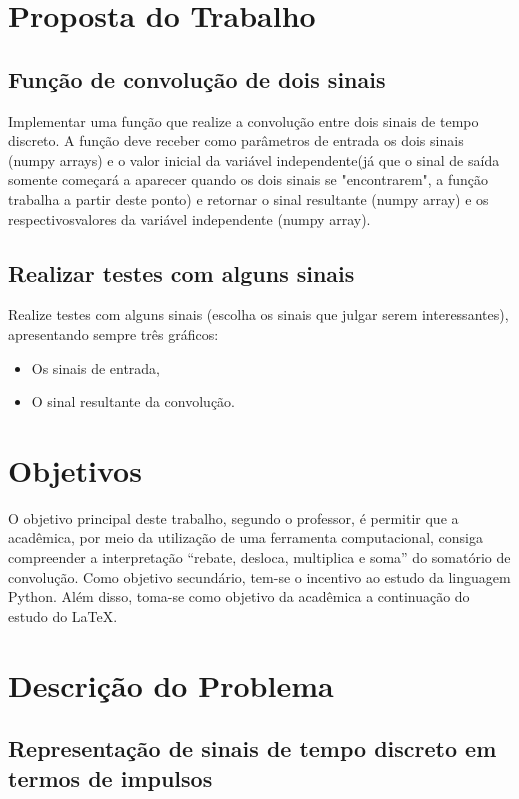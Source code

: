 \documentclass[dvipdfm, a4paper, 11pt]{report}
\begin{document}
{\section{Proposta do Trabalho}
\subsection{Função de convolução de dois sinais}
Implementar uma função que realize a convolução entre dois sinais de tempo discreto. A função
deve receber como parâmetros de entrada os dois sinais (numpy arrays) e o valor inicial da
variável independente(já que o sinal de saída somente começará a aparecer quando os dois sinais se "encontrarem", a função trabalha a partir deste ponto) e retornar o sinal resultante (numpy array) e os respectivosvalores da variável independente (numpy array).

\subsection{Realizar testes com alguns sinais}
Realize testes com alguns sinais (escolha os sinais que julgar serem interessantes), apresentando
sempre três gráficos:\\
\begin{itemize}
	\item Os sinais de entrada,
	\item O sinal resultante da convolução.
\end{itemize}
\section{Objetivos}
O objetivo principal deste trabalho, segundo o professor, é permitir que a acadêmica, 
por meio da utilização de uma ferramenta computacional, consiga compreender 
a interpretação “rebate, desloca, multiplica e soma” do somatório de convolução. 
Como objetivo secundário, tem-se o incentivo ao estudo da linguagem Python.
Além disso, toma-se como objetivo da acadêmica a continuação do estudo do \LaTeX.

\section{Descrição do Problema}\label{desc}
\subsection{Representação de sinais de tempo discreto em termos de impulsos}

}
\end{document}
